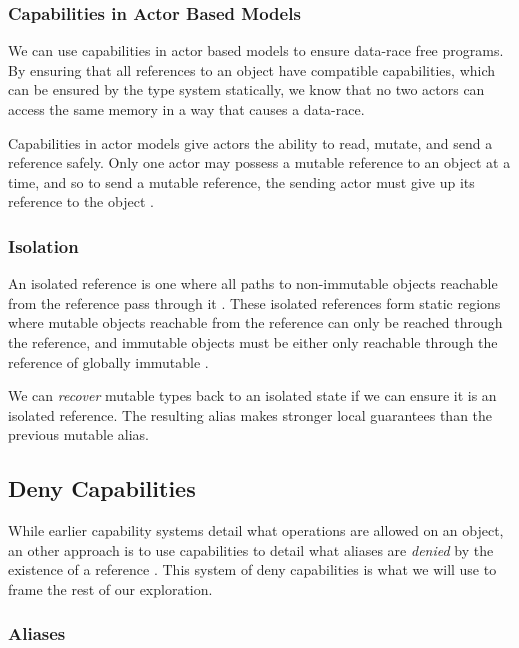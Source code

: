 \subsubsection{Capabilities in Actor Based Models}

We can use capabilities in actor based models to ensure data-race free programs. By ensuring that all references to an object have compatible capabilities, which can be ensured by the type system statically, we know that no two actors can access the same memory in a way that causes a data-race.

Capabilities in actor models give actors the ability to read, mutate, and send a reference safely. Only one actor may possess a mutable reference to an object at a time, and so to send a mutable reference, the sending actor must give up its reference to the object \cite{Srinivasana}.



\subsubsection{Isolation} \label{isolation}

An isolated reference is one where all paths to non-immutable objects reachable from the reference pass through it \cite{Gordon2012}. These isolated references form static regions where mutable objects reachable from the reference can only be reached through the reference, and immutable objects must be either only reachable through the reference of globally immutable \cite{Clebsch2015}.

We can \textit{recover} mutable types back to an isolated state if we can ensure it is an isolated reference. The resulting alias makes stronger local guarantees than the previous mutable alias.

\subsection{Deny Capabilities}

While earlier capability systems \cite{Srinivasana, Gordon2012, Boyland2001} detail what operations are allowed on an object, an other approach is to use capabilities to detail what aliases are \textit{denied} by the existence of a reference \cite{Clebsch2015}. This system of deny capabilities is what we will use to frame the rest of our exploration.

\subsubsection{Aliases}

